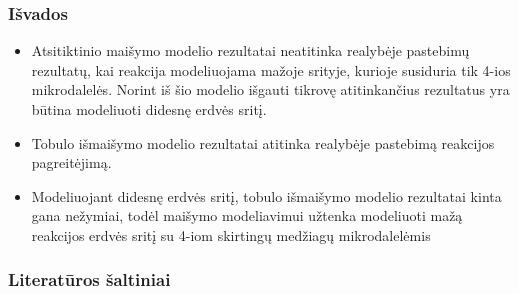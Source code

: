 \documentclass{beamer}
\begin{document}
\begin{frame}
\frametitle{Išvados}
\begin{itemize}
    \item Atsitiktinio maišymo modelio rezultatai neatitinka realybėje pastebimų rezultatų, kai reakcija modeliuojama mažoje srityje, kurioje susiduria tik 4-ios mikrodalelės. Norint iš šio modelio išgauti tikrovę atitinkančius rezultatus yra būtina modeliuoti didesnę erdvės sritį.

    \item Tobulo išmaišymo modelio rezultatai atitinka realybėje pastebimą reakcijos pagreitėjimą.
    
    \item Modeliuojant didesnę erdvės sritį, tobulo išmaišymo modelio rezultatai kinta gana nežymiai, todėl maišymo modeliavimui užtenka modeliuoti mažą reakcijos erdvės sritį su 4-iom skirtingų medžiagų mikrodalelėmis

\end{itemize}
\end{frame}

\begin{frame}
\frametitle{Literatūros šaltiniai}
\end{frame}
\end{document}
